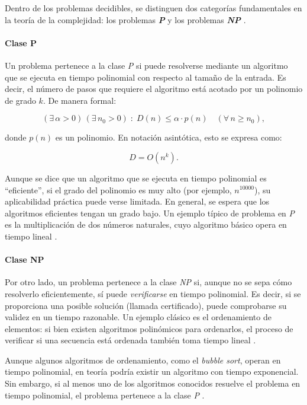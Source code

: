 \documentclass[12pt,titlepage,twoside,openright]{book}
\begin{document}
Dentro de los problemas decidibles, se distinguen dos categorías fundamentales en la teoría de la complejidad: los problemas \textbf{\emph{P}} y los problemas \textbf{\emph{NP}} \citep{maldonado2013problema}.

\paragraph{Clase P}

Un problema pertenece a la clase \emph{P} si puede resolverse mediante un algoritmo que se ejecuta en tiempo polinomial con respecto al tamaño de la entrada. Es decir, el número de pasos que requiere el algoritmo está acotado por un polinomio de grado \(k\). De manera formal:

\[
	(\exists\,\alpha > 0)\,(\exists\,n_0 > 0)\;:\; D(n) \leq \alpha \cdot p(n) \quad (\forall\,n \geq n_0),
\]

donde \(p(n)\) es un polinomio. En notación asintótica, esto se expresa como:

\[
	D = O(n^k).
\]

Aunque se dice que un algoritmo que se ejecuta en tiempo polinomial es “eficiente”, si el grado del polinomio es muy alto (por ejemplo, \(n^{10000}\)), su aplicabilidad práctica puede verse limitada. En general, se espera que los algoritmos eficientes tengan un grado bajo. Un ejemplo típico de problema en \emph{P} es la multiplicación de dos números naturales, cuyo algoritmo básico opera en tiempo lineal \citep{Flores2014}.

\paragraph{Clase NP}

Por otro lado, un problema pertenece a la clase \emph{NP} si, aunque no se sepa cómo resolverlo eficientemente, sí puede \emph{verificarse} en tiempo polinomial. Es decir, si se proporciona una posible solución (llamada certificado), puede comprobarse su validez en un tiempo razonable. Un ejemplo clásico es el ordenamiento de elementos: si bien existen algoritmos polinómicos para ordenarlos, el proceso de verificar si una secuencia está ordenada también toma tiempo lineal \citep{Flores2014}.

Aunque algunos algoritmos de ordenamiento, como el \emph{bubble sort}, operan en tiempo polinomial, en teoría podría existir un algoritmo con tiempo exponencial. Sin embargo, si al menos uno de los algoritmos conocidos resuelve el problema en tiempo polinomial, el problema pertenece a la clase \emph{P} \citep{Flores2014}.
\end{document}
